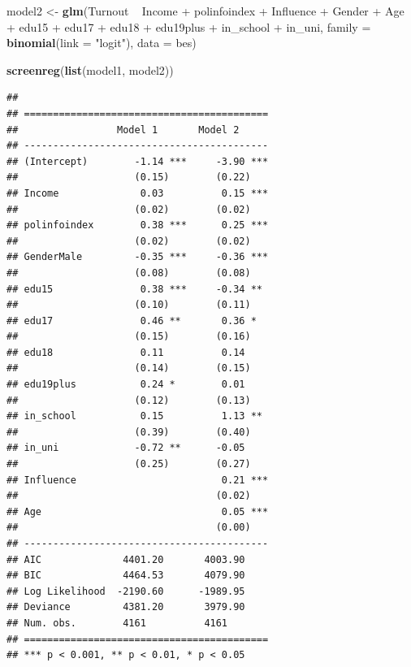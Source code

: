 \documentclass[]{article}
\newenvironment{Shaded}{\begin{snugshade}}{\end{snugshade}}
\newcommand{\KeywordTok}[1]{\textcolor[rgb]{0.13,0.29,0.53}{\textbf{{#1}}}}
\newcommand{\DataTypeTok}[1]{\textcolor[rgb]{0.13,0.29,0.53}{{#1}}}
\newcommand{\StringTok}[1]{\textcolor[rgb]{0.31,0.60,0.02}{{#1}}}
\newcommand{\NormalTok}[1]{{#1}}
\theoremstyle{definition}
\theoremstyle{definition}
\theoremstyle{remark}
\begin{document}
\begin{Shaded}
\begin{Highlighting}[]
\NormalTok{model2 <-}\StringTok{ }\KeywordTok{glm}\NormalTok{(Turnout ~}\StringTok{ }\NormalTok{Income +}\StringTok{ }\NormalTok{polinfoindex +}\StringTok{ }\NormalTok{Influence +}\StringTok{ }\NormalTok{Gender +}\StringTok{ }\NormalTok{Age +}\StringTok{ }
\StringTok{                }\NormalTok{edu15 +}\StringTok{ }\NormalTok{edu17 +}\StringTok{ }\NormalTok{edu18 +}\StringTok{ }\NormalTok{edu19plus +}\StringTok{ }\NormalTok{in_school +}\StringTok{ }\NormalTok{in_uni, }
              \DataTypeTok{family =} \KeywordTok{binomial}\NormalTok{(}\DataTypeTok{link =} \StringTok{"logit"}\NormalTok{), }\DataTypeTok{data =} \NormalTok{bes)}

\KeywordTok{screenreg}\NormalTok{(}\KeywordTok{list}\NormalTok{(model1, model2))}
\end{Highlighting}
\end{Shaded}

\begin{verbatim}
## 
## ==========================================
##                 Model 1       Model 2     
## ------------------------------------------
## (Intercept)        -1.14 ***     -3.90 ***
##                    (0.15)        (0.22)   
## Income              0.03          0.15 ***
##                    (0.02)        (0.02)   
## polinfoindex        0.38 ***      0.25 ***
##                    (0.02)        (0.02)   
## GenderMale         -0.35 ***     -0.36 ***
##                    (0.08)        (0.08)   
## edu15               0.38 ***     -0.34 ** 
##                    (0.10)        (0.11)   
## edu17               0.46 **       0.36 *  
##                    (0.15)        (0.16)   
## edu18               0.11          0.14    
##                    (0.14)        (0.15)   
## edu19plus           0.24 *        0.01    
##                    (0.12)        (0.13)   
## in_school           0.15          1.13 ** 
##                    (0.39)        (0.40)   
## in_uni             -0.72 **      -0.05    
##                    (0.25)        (0.27)   
## Influence                         0.21 ***
##                                  (0.02)   
## Age                               0.05 ***
##                                  (0.00)   
## ------------------------------------------
## AIC              4401.20       4003.90    
## BIC              4464.53       4079.90    
## Log Likelihood  -2190.60      -1989.95    
## Deviance         4381.20       3979.90    
## Num. obs.        4161          4161       
## ==========================================
## *** p < 0.001, ** p < 0.01, * p < 0.05
\end{verbatim}
\end{document}
